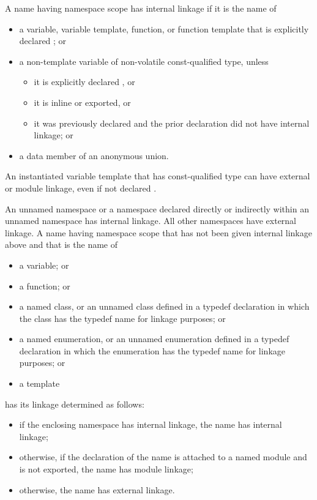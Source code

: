 \pnum
{}%
%
%
%
%
%
A name having namespace scope has internal
linkage if it is the name of
\begin{itemize}
\item
  a variable, variable template, function, or function template that is
  explicitly declared ; or
\item
  a non-template variable of non-volatile const-qualified type, unless
  \begin{itemize}
  \item it is explicitly declared , or
  \item it is inline or exported, or
  \item it was previously declared and the prior declaration did
  not have internal linkage; or
  \end{itemize}
\item
  a data member of an anonymous union.
\end{itemize}
\begin{note}
An instantiated variable template that has const-qualified type
can have external or module linkage, even if not declared .
\end{note}

\pnum
An unnamed namespace or a namespace declared directly or indirectly within an
unnamed namespace has internal linkage. All other namespaces have external linkage.
A name having namespace scope
that has not been given internal linkage above
and that is the name of
\begin{itemize}
\item a variable; or
\item a function; or
\item {}%
a named class, or an unnamed class defined in a
typedef declaration in which the class has the typedef name for linkage
purposes; or
\item {}%
a named enumeration, or an unnamed enumeration defined
in a typedef declaration in which the enumeration has the typedef name
for linkage purposes; or
\item a template
\end{itemize}
has its linkage determined as follows:
\begin{itemize}
\item
if the enclosing namespace has internal linkage,
the name has internal linkage;
\item
otherwise,
if the declaration of the name is
attached to a named module
and is not exported,
the name has module linkage;
\item
otherwise,
the name has external linkage.
\end{itemize}

